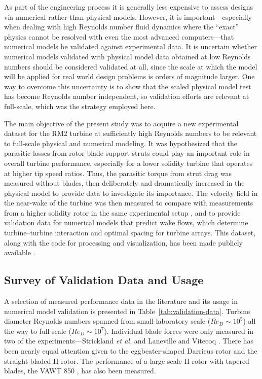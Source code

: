 \documentclass[10pt,letterpaper]{article}
\begin{document}
As part of the engineering process it is generally less expensive to assess
designs via numerical rather than physical models. However, it is
important---especially when dealing with high Reynolds number fluid dynamics
where the ``exact'' physics cannot be resolved with even the most advanced
computers---that numerical models be validated against experimental data. It is
uncertain whether numerical models validated with physical model data obtained
at low Reynolds numbers should be considered validated at all, since the scale
at which the model will be applied for real world design problems is orders of
magnitude larger. One way to overcome this uncertainty is to show that the
scaled physical model test has become Reynolds number independent, so validation
efforts are relevant at full-scale, which was the strategy employed here.

The main objective of the present study was to acquire a new experimental
dataset for the RM2 turbine at sufficiently high Reynolds numbers to be relevant
to full-scale physical and numerical modeling. It was hypothesized that the
parasitic losses from rotor blade support struts could play an important role in
overall turbine performance, especially for a lower solidity turbine that
operates at higher tip speed ratios. Thus, the parasitic torque from strut drag
was measured without blades, then deliberately and dramatically increased in the
physical model to provide data to investigate its importance. The velocity field
in the near-wake of the turbine was then measured to compare with measurements
from a higher solidity rotor in the same experimental setup
\cite{Bachant2015-JoT}, and to provide validation data for numerical models that
predict wake flows, which determine turbine--turbine interaction and optimal
spacing for turbine arrays. This dataset, along with the code for processing and
visualization, has been made publicly available \cite{Bachant2016-RM2-data}.


\subsection*{Survey of Validation Data and Usage}

A selection of measured performance data in the literature and its usage in
numerical model validation is presented in Table~\ref{tab:validation-data}.
Turbine diameter Reynolds numbers spanned from small laboratory scale ($Re_D
\sim 10^5$) all the way to full scale ($Re_D \sim 10^7$). Individual blade
forces were only measured in two of the experiments---Strickland \emph{et al.}
\cite{Strickland1981} and Laneville and Vitecoq \cite{Laneville1986}. There has
been nearly equal attention given to the eggbeater-shaped Darrieus rotor and the
straight-bladed H-rotor. The performance of a large scale H-rotor with tapered
blades, the VAWT 850 \cite{Mays1990}, has also been measured.
\end{document}

